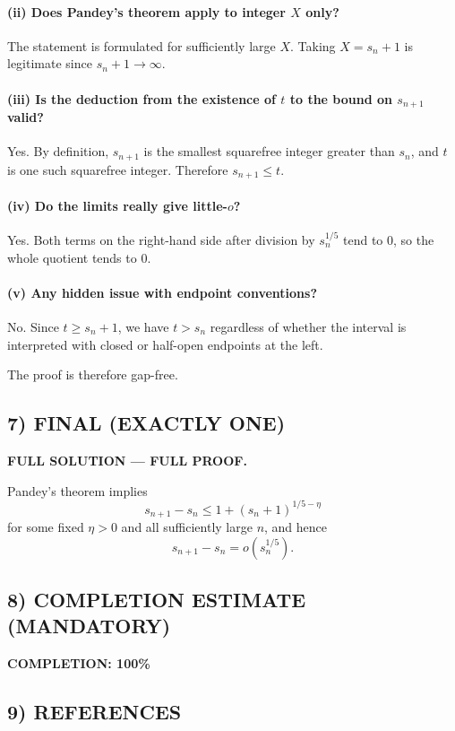 \paragraph{(ii) Does Pandey's theorem apply to integer $X$ only?}
The statement is formulated for sufficiently large $X$. Taking $X=s_n+1$ is legitimate since $s_n+1\to\infty$.

\paragraph{(iii) Is the deduction from the existence of $t$ to the bound on $s_{n+1}$ valid?}
Yes. By definition, $s_{n+1}$ is the smallest squarefree integer greater than $s_n$, and $t$ is one such squarefree integer. Therefore $s_{n+1}\le t$.

\paragraph{(iv) Do the limits really give little-$o$?}
Yes. Both terms on the right-hand side after division by $s_n^{1/5}$ tend to $0$, so the whole quotient tends to $0$.

\paragraph{(v) Any hidden issue with endpoint conventions?}
No. Since $t\ge s_n+1$, we have $t>s_n$ regardless of whether the interval is interpreted with closed or half-open endpoints at the left.

The proof is therefore gap-free.

\subsection*{7) FINAL (EXACTLY ONE)}

\textbf{FULL SOLUTION --- FULL PROOF.}

Pandey's theorem implies
\[
s_{n+1}-s_n\le 1+(s_n+1)^{1/5-\eta}
\]
for some fixed $\eta>0$ and all sufficiently large $n$, and hence
\[
s_{n+1}-s_n=o(s_n^{1/5}).
\]

\subsection*{8) COMPLETION ESTIMATE (MANDATORY)}

\textbf{COMPLETION: 100\%}

\subsection*{9) REFERENCES}

